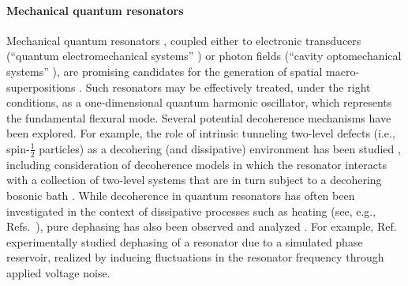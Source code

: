 \documentclass[3p,sort&compress]{elsarticle}
\begin{document}
\paragraph{Mechanical quantum resonators} Mechanical quantum resonators \cite{Aspelmeyer:2013:aa,Poot:2012:aa,Greenberg:2012:zz,Blencowe:2004:mm}, coupled either to electronic transducers (``quantum electromechanical systems'' \cite{Blencowe:2004:mm,Poot:2012:aa,Greenberg:2012:zz}) or photon fields (``cavity optomechanical systems'' \cite{Aspelmeyer:2013:aa}), are promising candidates for the generation of spatial macro-superpositions \cite{Arndt:2014:oo}. Such resonators may be effectively treated, under the right conditions, as a one-dimensional quantum harmonic oscillator, which represents the fundamental flexural mode.  Several potential decoherence mechanisms have been explored. For example, the role of intrinsic tunneling two-level defects (i.e., spin-$\frac{1}{2}$ particles) as a decohering (and dissipative) environment has been studied \cite{Mohanty:2002:mm,Ahn:2003:mt,Blencowe:2004:mm,Blencowe:2005:cc,Zolfagharkhani:2005:tv,Seoanez:2006:yb,Seoanez:2007:um,Remus:2009:im,Schlosshauer:2008:os,Aspelmeyer:2013:aa}, including consideration of decoherence models in which the resonator interacts with a collection of two-level systems that are in turn subject to a decohering bosonic bath \cite{Schlosshauer:2008:os,Remus:2009:im}. While decoherence in quantum resonators has often been investigated in the context of dissipative processes such as heating (see, e.g., Refs.~\cite{Mohanty:2002:mm,Ahn:2003:mt,Zolfagharkhani:2005:tv,Seoanez:2006:yb,Seoanez:2007:um,Aspelmeyer:2013:aa}), pure dephasing has also been observed and analyzed \cite{Fong:2012:aa,Zhang:2014:oo,Miao:2014:ii,Moser:2014:uu,Maillet:2016:zz}. For example, Ref.~\cite{Maillet:2016:zz} experimentally studied dephasing of a resonator due to a simulated phase reservoir, realized by inducing fluctuations in the resonator frequency through applied voltage noise. 
 
\end{document}
